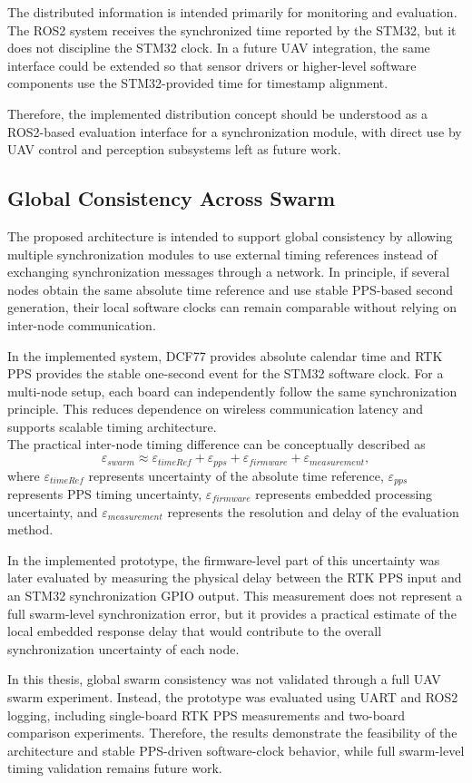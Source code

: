 The distributed information is intended primarily for monitoring and evaluation. The ROS2 system receives the synchronized time reported by the STM32, but it does not discipline the STM32 clock. In a future UAV integration, the same interface could be extended so that sensor drivers or higher-level software components use the STM32-provided time for timestamp alignment.

Therefore, the implemented distribution concept should be understood as a ROS2-based evaluation interface for a synchronization module, with direct use by UAV control and perception subsystems left as future work.

\subsection{Global Consistency Across Swarm}

The proposed architecture is intended to support global consistency by allowing multiple synchronization modules to use external timing references instead of exchanging synchronization messages through a network. In principle, if several nodes obtain the same absolute time reference and use stable PPS-based second generation, their local software clocks can remain comparable without relying on inter-node communication.

In the implemented system, DCF77 provides absolute calendar time and RTK PPS provides the stable one-second event for the STM32 software clock. For a multi-node setup, each board can independently follow the same synchronization principle. This reduces dependence on wireless communication latency and supports scalable timing architecture.
\\
The practical inter-node timing difference can be conceptually described as
\begin{equation}
\varepsilon_{swarm} \approx \varepsilon_{timeRef} + \varepsilon_{pps} + \varepsilon_{firmware} + \varepsilon_{measurement},
\end{equation}
where $\varepsilon_{timeRef}$ represents uncertainty of the absolute time reference, $\varepsilon_{pps}$ represents PPS timing uncertainty, $\varepsilon_{firmware}$ represents embedded processing uncertainty, and $\varepsilon_{measurement}$ represents the resolution and delay of the evaluation method.

In the implemented prototype, the firmware-level part of this uncertainty was later evaluated by measuring the physical delay between the RTK PPS input and an STM32 synchronization GPIO output. This measurement does not represent a full swarm-level synchronization error, but it provides a practical estimate of the local embedded response delay that would contribute to the overall synchronization uncertainty of each node.

In this thesis, global swarm consistency was not validated through a full UAV swarm experiment. Instead, the prototype was evaluated using UART and ROS2 logging, including single-board RTK PPS measurements and two-board comparison experiments. Therefore, the results demonstrate the feasibility of the architecture and stable PPS-driven software-clock behavior, while full swarm-level timing validation remains future work.